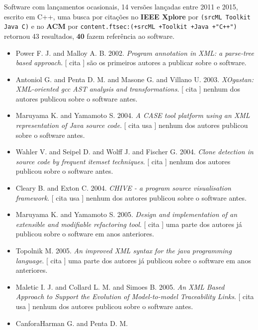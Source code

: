 Software com lançamentos ocasionais,
14 versões lançadas
entre 2011 e 2015,
escrito em C++,
uma busca por citações no {\bf IEEE Xplore} por
\texttt{(srcML Toolkit Java C)}
e no {\bf ACM} por
\texttt{content.ftsec:(+srcML +Toolkit +Java +"C++")}
retornou
43 resultados,
{\bf 40} fazem referência ao software.

\begin{itemize}
\item Power F. J. and Malloy A. B.
      2002.
        \textit{ Program annotation in XML: a parse-tree based approach}.
      [
          cita
      ]
são os primeiros autores a publicar sobre o software.
\item Antoniol G. and Penta D. M. and Masone G. and Villano U.
      2003.
        \textit{ XOgastan: XML-oriented gcc AST analysis and transformations}.
      [
          cita
      ]
nenhum dos autores publicou sobre o software antes.
\item Maruyama K. and Yamamoto S.
      2004.
        \textit{ A CASE tool platform using an XML representation of Java source code}.
      [
          cita
          usa
      ]
nenhum dos autores publicou sobre o software antes.
\item Wahler V. and Seipel D. and Wolff J. and Fischer G.
      2004.
        \textit{ Clone detection in source code by frequent itemset techniques}.
      [
          cita
      ]
nenhum dos autores publicou sobre o software antes.
\item Cleary B. and Exton C.
      2004.
        \textit{ CHIVE - a program source visualisation framework}.
      [
          cita
          usa
      ]
nenhum dos autores publicou sobre o software antes.
\item Maruyama K. and Yamamoto S.
      2005.
        \textit{ Design and implementation of an extensible and modifiable refactoring tool}.
      [
          cita
      ]
uma parte dos autores já publicou sobre o software em anos anteriores.
\item Topolnik M.
      2005.
        \textit{ An improved XML syntax for the java programming language}.
      [
          cita
      ]
uma parte dos autores já publicou sobre o software em anos anteriores.
\item Maletic I. J. and Collard L. M. and Simoes B.
      2005.
        \textit{ An XML Based Approach to Support the Evolution of Model-to-model Traceability Links}.
      [
          cita
          usa
      ]
nenhum dos autores publicou sobre o software antes.
\item CanforaHarman G. and Penta D. M.

\end{itemize}
